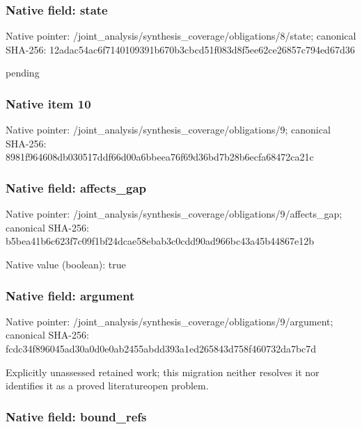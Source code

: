 \documentclass[10pt,a4paper]{article}
\begin{document}
\subsubsection{Native field: state}


Native pointer: /joint\_analysis/synthesi\allowbreak{}s\_coverage/obligations/8\allowbreak{}/state; canonical SHA-256: 12adac54ac6f7140109391b6\allowbreak{}70b3cbcd51f083d8f5ee62ce\allowbreak{}26857c794ed67d36


pending


\subsubsection{Native item 10}


Native pointer: /joint\_analysis/synthesi\allowbreak{}s\_coverage/obligations/9; canonical SHA-256: 8981f964608db030517ddf66\allowbreak{}d00a6bbeea76f69d36bd7b28\allowbreak{}b6ecfa68472ca21c



\subsubsection{Native field: affects\_gap}


Native pointer: /joint\_analysis/synthesi\allowbreak{}s\_coverage/obligations/9\allowbreak{}/affects\_gap; canonical SHA-256: b5bea41b6c623f7c09f1bf24\allowbreak{}dcae58ebab3c0cdd90ad966b\allowbreak{}c43a45b44867e12b



Native value (boolean): true



\subsubsection{Native field: argument}


Native pointer: /joint\_analysis/synthesi\allowbreak{}s\_coverage/obligations/9\allowbreak{}/argument; canonical SHA-256: fcdc34f896045ad30a0d0e0a\allowbreak{}b2455abdd393a1ed265843d7\allowbreak{}58f460732da7bc7d


Explicitly unassessed retained work; this migration neither resolves it nor identifies it as a proved literatureopen problem.


\subsubsection{Native field: bound\_refs}
\end{document}
